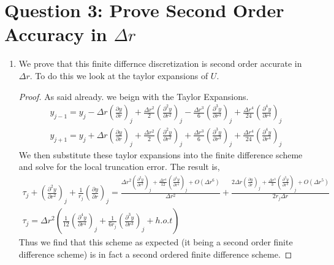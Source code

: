 \documentclass{article}
\begin{document}
\section*{Question 3: Prove Second Order Accuracy in $\Delta r$}

\begin{enumerate}[label=\alph*)]

    \item We prove that this finite differnce discretization is second order
    accurate in $\Delta r$. To do this we look at the taylor expansions of $U$. 
    \begin{proof}
        As said already. we beign with the Taylor Expansions.
        \begin{align*}
            y_{j-1} = y_j - \Delta r \left(\frac{\partial y}{\partial r}\right)_j
            + \frac{\Delta r^2}{2}\left(\frac{\partial^2 y}{\partial
            r^2}\right)_j - \frac{\Delta r^3}{6}\left(\frac{\partial^3 y}{\partial
            r^3}\right)_j + \frac{\Delta r^4}{24}\left(\frac{\partial^4 y}{\partial
            r^4}\right)_j\\
            y_{j+1} = y_j + \Delta r \left(\frac{\partial y}{\partial r}\right)_j
            + \frac{\Delta r^2}{2}\left(\frac{\partial^2 y}{\partial
            r^2}\right)_j + \frac{\Delta r^3}{6}\left(\frac{\partial^3 y}{\partial
            r^3}\right)_j + \frac{\Delta r^4}{24}\left(\frac{\partial^4 y}{\partial
            r^4}\right)_j
        \end{align*}
        We then substitute these taylor expansions into the finite difference
        scheme and solve for the local truncation error. The result is, 
        \begin{align*}
            \tau_j +  \left(\frac{\partial^2 y}{\partial
            r^2}\right)_j + \frac{1}{r_j}\left(\frac{\partial y}{\partial
            r}\right)_j = \frac{\Delta r^2\left(\frac{\partial^2 y}{\partial
            r^2}\right)_j + \frac{\Delta r^4}{12}\left(\frac{\partial^4 y}{\partial
            r^4}\right)_j + O(\Delta r^6) }{\Delta r^2} + \frac{ 2\Delta r \left(\frac{\partial y}{
            \partial r}\right)_j + \frac{\Delta r^3}{3}\left(\frac{\partial^3 y}{\partial
            r^3}\right)_j + O(\Delta r^5) }{2r_j\Delta r} \\
            \tau_j = \Delta r^2 \left(\frac{1}{12}\left(\frac{\partial^4 y}{\partial
            r^4}\right)_j + \frac{1}{6r_j}\left(\frac{\partial^3 y}{\partial
            r^3}\right)_j + h.o.t\right)
        \end{align*}
        Thus we find that this scheme as expected (it being a second order
        finite difference scheme) is in fact a second ordered finite difference
        scheme. 
    \end{proof}
\end{enumerate}
\end{document}
